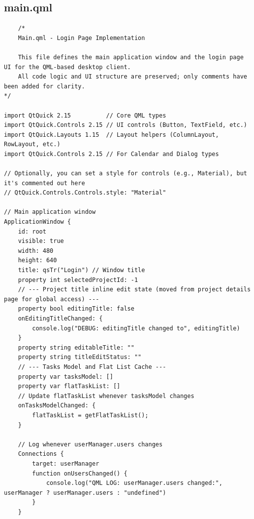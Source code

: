 \documentclass{report}
\begin{document}
\subsection{main.qml}
\begin{lstlisting}
    /*
    Main.qml - Login Page Implementation

    This file defines the main application window and the login page UI for the QML-based desktop client.
    All code logic and UI structure are preserved; only comments have been added for clarity.
*/

import QtQuick 2.15          // Core QML types
import QtQuick.Controls 2.15 // UI controls (Button, TextField, etc.)
import QtQuick.Layouts 1.15  // Layout helpers (ColumnLayout, RowLayout, etc.)
import QtQuick.Controls 2.15 // For Calendar and Dialog types

// Optionally, you can set a style for controls (e.g., Material), but it's commented out here
// QtQuick.Controls.Controls.style: "Material"

// Main application window
ApplicationWindow {
    id: root
    visible: true
    width: 480
    height: 640
    title: qsTr("Login") // Window title
    property int selectedProjectId: -1
    // --- Project title inline edit state (moved from project details page for global access) ---
    property bool editingTitle: false
    onEditingTitleChanged: {
        console.log("DEBUG: editingTitle changed to", editingTitle)
    }
    property string editableTitle: ""
    property string titleEditStatus: ""
    // --- Tasks Model and Flat List Cache ---
    property var tasksModel: []
    property var flatTaskList: []
    // Update flatTaskList whenever tasksModel changes
    onTasksModelChanged: {
        flatTaskList = getFlatTaskList();
    }

    // Log whenever userManager.users changes
    Connections {
        target: userManager
        function onUsersChanged() {
            console.log("QML LOG: userManager.users changed:", userManager ? userManager.users : "undefined")
        }
    }


\end{lstlisting}
\end{document}
